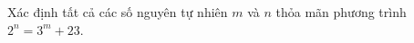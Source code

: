 \ifshowproblem
\begin{problem}\label{example:FRA-2015-TST3-P5}
    Xác định tất cả các số nguyên tự nhiên $m$ và $n$ thỏa mãn phương trình $2^n = 3^m + 23$.
\end{problem}
\fi

\fi